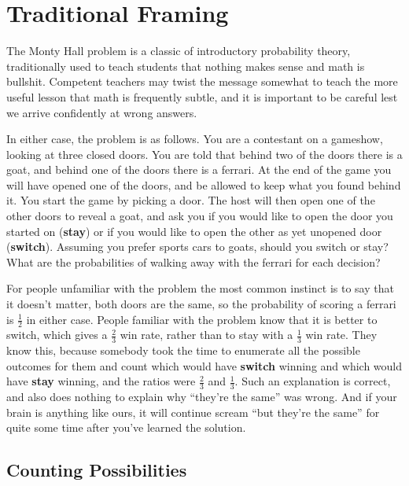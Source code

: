 \documentclass[12pt]{article}
\begin{document}
\maketitle


\section{Traditional Framing}
The Monty Hall problem is a classic of introductory probability theory, traditionally used
to teach students that nothing makes sense and math is bullshit. Competent teachers may twist
the message somewhat to teach the more useful lesson that math is frequently subtle, and it
is important to be careful lest we arrive confidently at wrong answers.

In either case, the problem is as follows. You are a contestant on a gameshow, looking at 
three closed doors. You are told that behind two of the doors there is a goat, and behind one
of the doors there is a ferrari. At the end of the game you will have opened one of the doors,
and be allowed to keep what you found behind it. You start the game by picking a door. The host
will then open one of the other doors to reveal a goat, and ask you if you would like to open 
the door you started on (\textbf{stay}) or if you would like to open the other as yet unopened door 
(\textbf{switch}). Assuming you prefer sports cars to goats, should you switch or stay? What are the 
probabilities of walking away with the ferrari for each decision?

For people unfamiliar with the problem the most common instinct is to say that it doesn't matter,
both doors are the same, so the probability of scoring a ferrari is $\frac{1}{2}$ in either case.
People familiar with the problem know that it is better to switch, which gives a $\frac{2}{3}$ win
rate, rather than to stay with a $\frac{1}{3}$ win rate. They know this, because somebody took the
time to enumerate all the possible outcomes for them and count which would have \textbf{switch} winning and 
which would have \textbf{stay} winning, and the ratios were $\frac{2}{3}$ and $\frac{1}{3}$. Such an 
explanation is correct, and also does nothing to explain why ``they're the same'' was wrong. And
if your brain is anything like ours, it will continue scream ``but they're the same'' for quite
some time after you've learned the solution.

\subsection{Counting Possibilities}
\end{document}
